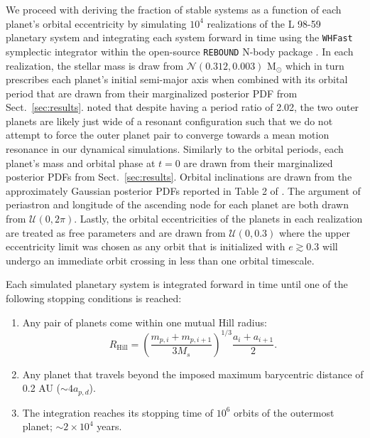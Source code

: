 \documentclass[longauth]{aa}
\begin{document}
We proceed with deriving the fraction of stable systems as a function of each planet's orbital eccentricity by simulating $10^4$ realizations of the L 98-59 planetary system and integrating each system forward in time using the \texttt{WHFast} symplectic integrator \citep{rein15} within the open-source \texttt{REBOUND} N-body package \citep{rein12}. In each realization, the stellar mass is draw from $\mathcal{N}(0.312,0.003)$ M$_{\odot}$ which in turn prescribes each planet's initial semi-major axis when combined with its orbital period that are drawn from their marginalized posterior PDF from Sect.~\ref{sec:results}.  noted that despite having a period ratio of 2.02, the two outer planets are likely just wide of a resonant configuration such that we do not attempt to force the outer planet pair to converge towards a mean motion resonance in our dynamical simulations. Similarly to the orbital periods, each planet's mass and orbital phase at $t=0$ are drawn from their marginalized posterior PDFs from Sect.~\ref{sec:results}. Orbital inclinations are drawn from the approximately Gaussian posterior PDFs reported in Table 2 of . The argument of periastron and longitude of the ascending node for each planet are both drawn from $\mathcal{U}(0,2\pi)$. Lastly, the orbital eccentricities of the planets in each realization are treated as free parameters and are drawn from $\mathcal{U}(0,0.3)$ where the upper eccentricity limit was chosen as any orbit that is initialized with $e\gtrsim 0.3$ will undergo an immediate orbit crossing in less than one orbital timescale. 

Each simulated planetary system is integrated forward in time until one of the following stopping conditions is reached:

\begin{enumerate}
    \item Any pair of planets come within one mutual Hill radius:
    \begin{equation}
        R_{\text{Hill}} = \left( \frac{m_{p,i}+m_{p,i+1}}{3M_s} \right)^{1/3} \frac{a_i+a_{i+1}}{2}.
    \end{equation} 
    \item Any planet that travels beyond the imposed maximum barycentric distance of 0.2 AU ($\sim 4 a_{p,d}$). 
    \item The integration reaches its stopping time of $10^6$ orbits of the outermost planet; $\sim 2\times 10^4$ years. 
\end{enumerate}
\end{document}
